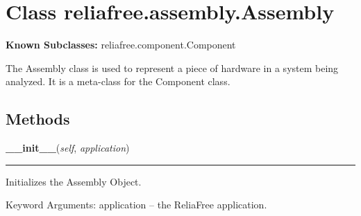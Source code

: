 %
%
%


\section{Class reliafree.assembly.Assembly}

    \label{reliafree:assembly:Assembly}
\textbf{Known Subclasses:} reliafree.component.Component

The Assembly class is used to represent a piece of hardware in a system 
being analyzed.  It is a meta-class for the Component class.



  \subsection{Methods}

    \label{reliafree:assembly:Assembly:__init__}

    \vspace{0.5ex}

\hspace{.8\funcindent}\begin{boxedminipage}{\funcwidth}

    \raggedright \textbf{\_\_init\_\_}(\textit{self}, \textit{application})

    \vspace{-1.5ex}

    \rule{\textwidth}{0.5\fboxrule}
\setlength{\parskip}{2ex}
    Initializes the Assembly Object.

    Keyword Arguments: application -- the ReliaFree application.

\setlength{\parskip}{1ex}
    \end{boxedminipage}

